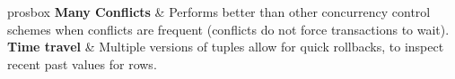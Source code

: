 \begin{tabbox}{prosbox}
    \textbf{Many Conflicts} & Performs better than other concurrency control schemes when conflicts are frequent (conflicts do not force transactions to wait). \\
    \textbf{Time travel} & Multiple versions of tuples allow for quick rollbacks, to inspect recent past values for rows. \\
\end{tabbox}
